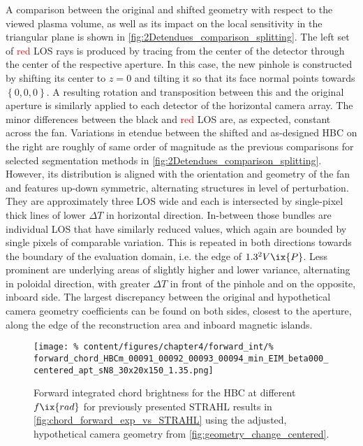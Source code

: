 %
            A comparison between the original and shifted geometry with respect to the viewed plasma volume, as well as its impact on the local sensitivity in the triangular plane is shown in \cref{fig:2Detendues_comparison_splitting}. The left set of \textcolor{red}{red} LOS rays is produced by tracing from the center of the detector through the center of the respective aperture. In this case, the new pinhole is constructed by shifting its center to $z=0$ and tilting it so that its face normal points towards $\left\{0, 0, 0\right\}$. A resulting rotation and transposition between this and the original aperture is similarly applied to each detector of the horizontal camera array. The minor differences between the black and \textcolor{red}{red} LOS are, as expected, constant across the fan. Variations in etendue between the shifted and as-designed HBC on the right are roughly of same order of magnitude as the previous comparisons for selected segmentation methods in \cref{fig:2Detendues_comparison_splitting}.  However, its distribution is aligned with the orientation and geometry of the fan and features up-down symmetric, alternating structures in level of perturbation. They are approximately three LOS wide and each is intersected by single-pixel thick lines of lower $\Delta T$
            in horizontal direction. In-between those bundles are individual LOS that have similarly reduced values, which again are bounded by single pixels of comparable variation. This is repeated in both directions towards the boundary of the evaluation domain, i.e. the edge of $1.3^{2}V\ix{P}$. Less prominent are underlying areas of slightly higher and lower variance, alternating in poloidal direction, with greater $\Delta T$ in front of the pinhole and on the opposite, inboard side. The largest discrepancy between the original and hypothetical camera geometry coefficients can be found on both sides, closest to the aperture, along the edge of the reconstruction area and inboard magnetic islands.\\%
%
            \begin{figure}[t]%
                \centering%
                \texttt{[image: \%
                    content/figures/chapter4/forward\_int/\%
                    forward\_chord\_HBCm\_00091\_00092\_00093\_00094\_min\_EIM\_beta000\_centered\_apt\_sN8\_30x20x150\_1.35.png]}%
                \caption{Forward integrated chord brightness for the HBC at different $f\ix{rad}$ for previously presented STRAHL results in \cref{fig:chord_forward_exp_vs_STRAHL} using the adjusted, hypothetical camera geometry from \cref{fig:geometry_change_centered}.}\label{fig:forward_intSTRAHL_centered}%
            \end{figure}%
